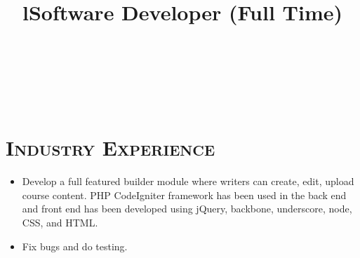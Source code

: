 \begin{resume}




\begin{formatb}
  \title{l}\\
  \\
  \body\\
\end{formatb}

\section{\textsc{Industry Experience}}
\title{\bf Software Developer (Full Time)}
\begin{position}
\vspace*{-.2cm}
\begin{itemize}
\item Develop a full featured builder module  where writers can create, edit, upload course content. PHP CodeIgniter framework has been used in the back end and front end has been developed using jQuery, backbone, underscore, node, CSS, and HTML. 
\item  Fix bugs and do testing.
\end{itemize}
\end{position}
\vspace*{-.2cm}


\end{resume}
